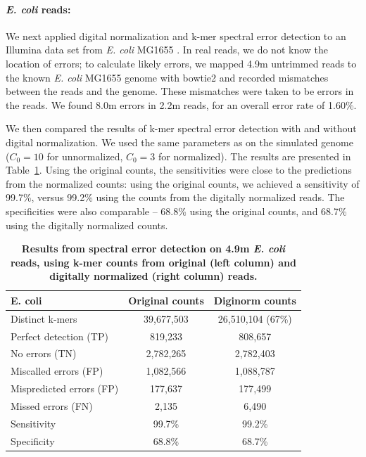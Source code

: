 \documentclass{article}
\begin{document}

\paragraph{{\em E. coli} reads:}
We next applied digital normalization and k-mer spectral error
detection to an Illumina data set from {\em E. coli} MG1655
\cite{pubmed21926975}.  In real reads, we do not know the location of
errors; to calculate likely errors, we mapped 4.9m untrimmed reads to
the known {\em E. coli} MG1655 genome with bowtie2 \cite{bowtie2} and
recorded mismatches between the reads and the genome.  These
mismatches were taken to be errors in the reads.  We found 8.0m errors
in 2.2m reads, for an overall error rate of 1.60\%.

We then compared the results of k-mer spectral error detection with
and without digital normalization.  We used the same parameters as on
the simulated genome ($C_0=10$ for unnormalized, $C_0=3$ for
normalized).  The results are presented in
Table~\ref{tab:ecoli_dn_counts}. Using the original counts, the
sensitivities were close to the predictions from the normalized
counts: using the original counts, we achieved a sensitivity of
99.7\%, versus 99.2\% using the counts from the digitally normalized
reads.  The specificities were also comparable -- 68.8\% using the original
counts, and 68.7\% using the digitally normalized counts.


\begin{table}
\centering
\begin{tabular}{|l|c|c|}
\hline
{\bf E. coli} & Original counts & Diginorm counts \\
\hline
Distinct k-mers         & 39,677,503 & 26,510,104 (67\%) \\
\hline
Perfect detection (TP)  & 819,233   & 808,657 \\
No errors (TN)          & 2,782,265 & 2,782,403 \\
Miscalled errors (FP)   & 1,082,566 & 1,088,787 \\
Mispredicted errors (FP)& 177,637       & 177,499   \\
Missed errors (FN)      & 2,135     & 6,490    \\
\hline
Sensitivity & 99.7\% & 99.2\% \\
Specificity & 68.8\% & 68.7\% \\
\hline
\end{tabular}


\caption{{\bf Results from spectral error detection on 4.9m {\em
      E. coli} reads, using k-mer counts from original (left column)
    and digitally normalized (right column) reads.}}

\label{tab:ecoli_dn_counts}
\end{table}
\end{document}
